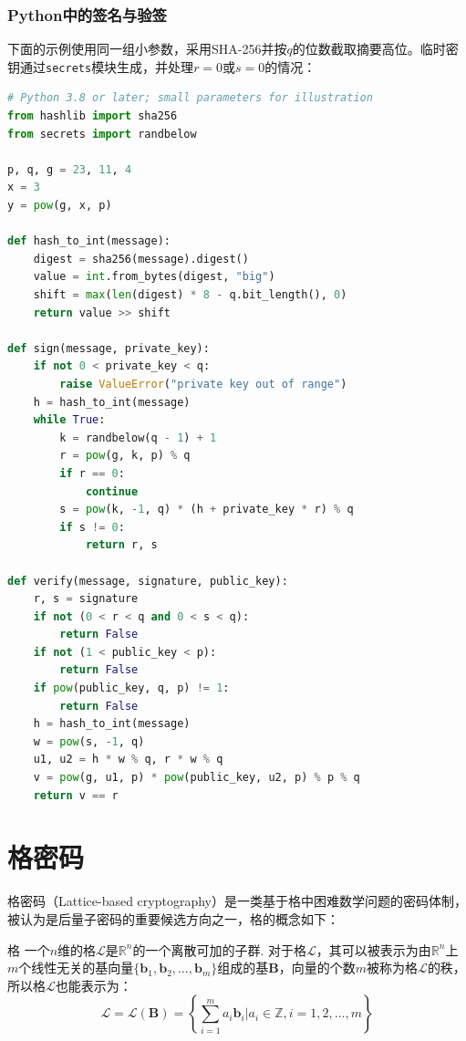 \documentclass{book}
\numberwithin{equation}{subsubsection}
\begin{document}
\subsubsection{Python中的签名与验签}
下面的示例使用同一组小参数，采用SHA-256并按$q$的位数截取摘要高位。临时密钥通过\texttt{secrets}模块生成，并处理$r=0$或$s=0$的情况：
\begin{lstlisting}[language=Python,basicstyle=\ttfamily,breaklines=true,keywordstyle=\bfseries\color{blue}]
# Python 3.8 or later; small parameters for illustration
from hashlib import sha256
from secrets import randbelow

p, q, g = 23, 11, 4
x = 3
y = pow(g, x, p)

def hash_to_int(message):
    digest = sha256(message).digest()
    value = int.from_bytes(digest, "big")
    shift = max(len(digest) * 8 - q.bit_length(), 0)
    return value >> shift

def sign(message, private_key):
    if not 0 < private_key < q:
        raise ValueError("private key out of range")
    h = hash_to_int(message)
    while True:
        k = randbelow(q - 1) + 1
        r = pow(g, k, p) % q
        if r == 0:
            continue
        s = pow(k, -1, q) * (h + private_key * r) % q
        if s != 0:
            return r, s

def verify(message, signature, public_key):
    r, s = signature
    if not (0 < r < q and 0 < s < q):
        return False
    if not (1 < public_key < p):
        return False
    if pow(public_key, q, p) != 1:
        return False
    h = hash_to_int(message)
    w = pow(s, -1, q)
    u1, u2 = h * w % q, r * w % q
    v = pow(g, u1, p) * pow(public_key, u2, p) % p % q
    return v == r

\end{lstlisting}
\par

\newpage
\section{格密码}
格密码（Lattice-based cryptography）是一类基于格中困难数学问题的密码体制，被认为是后量子密码的重要候选方向之一，格的概念如下：

\begin{concept}{格}
    一个$n$维的格$\mathcal{L}$是$\mathbb{R}^{n}$的一个离散可加的子群.
    对于格$\mathcal{L}$，其可以被表示为由$\mathbb{R}^{n}$上$m$个线性无关的基向量$\{\pmb{b}_1,\pmb{b}_2,\ldots,\pmb{b}_m\}$组成的基$\pmb{B}$，向量的个数$m$被称为格$\mathcal{L}$的秩，所以格$\mathcal{L}$也能表示为：
    \begin{equation}
        \mathcal{L}=\mathcal{L}(\pmb{B})=\left\{\sum_{i=1}^{m}a_i\pmb{b}_i|a_i\in\mathbb{Z},i=1,2,\ldots,m\right\}
        \nonumber
    \end{equation}
\end{concept}
\end{document}
